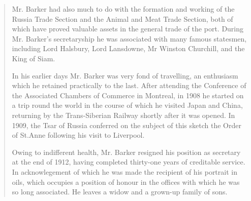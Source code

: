 \begin{quotation}
Mr. Barker had also much to do with the formation and working of the Russia Trade Section and the Animal and Meat Trade Section, both of which have proved valuable assets in the general trade of the port. During Mr. Barker's secretaryship he was associated with many famous statesmen, including Lord Halsbury, Lord Lansdowne, Mr Winston Churchill, and the King of Siam.

In his earlier days Mr. Barker was very fond of travelling, an enthusiasm which he retained practically to the last. After attending the Conference of the Associated Chambers of Commerce in Montreal, in 1908 he started on a trip round the world in the course of which he visited Japan and China, returning by the Trans-Siberian Railway shortly after it was opened.  In 1909, the Tsar of Russia conferred on the subject of this sketch the Order of St.Anne following his visit to Liverpool.

Owing to indifferent health, Mr. Barker resigned his position as secretary at the end of 1912, having completed thirty-one years of creditable service. In acknowlegement of which he was made the recipient of his portrait in oils, which occupies a position of honour in the offices with which he was so long associated.  He leaves a widow and a grown-up family of sons.
\end{quotation}
